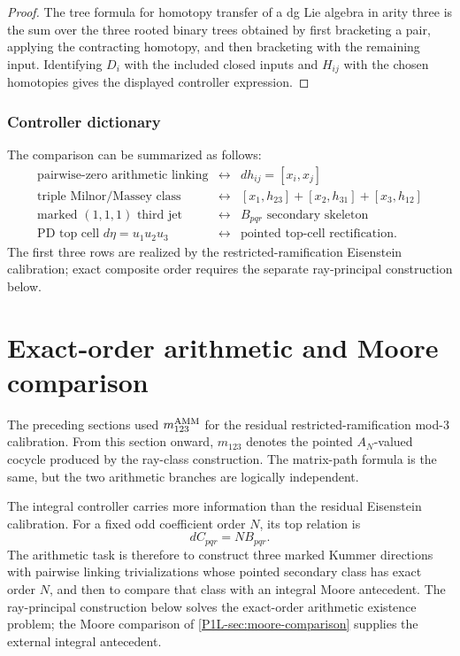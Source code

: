 \documentclass[11pt]{article}
\theoremstyle{remark}
\begin{document}
\begin{proof}
The tree formula for homotopy transfer of a dg Lie algebra in arity three is the sum over the three rooted binary trees obtained by first bracketing a pair, applying the contracting homotopy, and then bracketing with the remaining input.  Identifying \(D_i\) with the included closed inputs and \(H_{ij}\) with the chosen homotopies gives the displayed controller expression.
\end{proof}

\subsubsection{Controller dictionary}

The comparison can be summarized as follows:
\[
\boxed{
\begin{array}{ccc}
\text{pairwise-zero arithmetic linking}
&\longleftrightarrow&
 dh_{ij}=[x_i,x_j]
\\[1mm]
\text{triple Milnor/Massey class}
&\longleftrightarrow&
 [x_1,h_{23}]+[x_2,h_{31}]+[x_3,h_{12}]
\\[1mm]
\text{marked }(1,1,1)\text{ third jet}
&\longleftrightarrow&
 B_{pqr}\text{ secondary skeleton}
\\[1mm]
\text{PD top cell }d\eta=u_1u_2u_3
&\longleftrightarrow&
\text{pointed top-cell rectification.}
\end{array}}
\]
The first three rows are realized by the restricted-ramification Eisenstein calibration; exact composite order requires the separate ray-principal construction below.


\section{Exact-order arithmetic and Moore comparison}

The preceding sections used \(m_{123}^{\rm AMM}\) for the residual
restricted-ramification mod-\(3\) calibration.  From this section onward,
\(m_{123}\) denotes the pointed \(A_N\)-valued cocycle produced by the
ray-class construction.  The matrix-path formula is the same, but the two
arithmetic branches are logically independent.

The integral controller carries more information than the residual
Eisenstein calibration.  For a fixed odd coefficient order \(N\), its top
relation is
\[
 dC_{pqr}=N B_{pqr}.
\]
The arithmetic task is therefore to construct three marked Kummer
directions with pairwise linking trivializations whose pointed secondary
class has exact order \(N\), and then to compare that class with an integral
Moore antecedent.  The ray-principal construction below solves the
exact-order arithmetic existence problem; the Moore comparison of
\cref{P1L-sec:moore-comparison} supplies the external integral antecedent.
\end{document}

